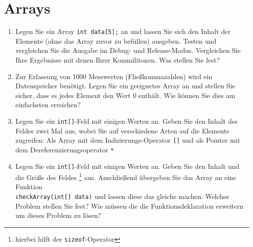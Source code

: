 \documentclass[paper=a4, fontsize=11pt, twoside]{scrartcl}
\begin{document}
\section*{Arrays}
\begin{enumerate}[resume]
  \item Legen Sie ein Array \texttt{int data[5];} an und lassen Sie sich den Inhalt der Elemente (ohne das Array zuvor zu befüllen) ausgeben. Testen und vergleichen Sie die Ausgabe im Debug- und Release-Modus. Vergleichen Sie Ihre Ergebnisse mit denen Ihrer Kommilitonen. Was stellen Sie fest?
  \item Zur Erfassung von 1000 Messwerten (Fließkommazahlen) wird ein Datenspeicher benötigt. Legen Sie ein geeignetes Array an und stellen Sie sicher, dass es jedes Element den Wert 0 enthält. Wie können Sie dies am einfachsten erreichen?
  \item Legen Sie ein \texttt{int[]}-Feld mit einigen Werten an. Geben Sie den Inhalt des Feldes zwei Mal aus, wobei Sie auf verschiedene Arten auf die Elemente zugreifen: Als Array mit dem Indizierungs-Operator \texttt{[]} und als Pointer mit dem Dereferenzierungsoperator \texttt{*}
  \item Legen Sie ein \texttt{int[]}-Feld mit einigen Werten an. Geben Sie den Inhalt und die Größe des Feldes \footnote{hierbei hilft der \texttt{sizeof}-Operator} aus. Anschließend übergeben Sie das Array an eine Funktion \\\texttt{checkArray(int[] data)} und lassen diese das gleiche machen. Welches Problem stellen Sie fest? Wie müssen die die Funktionsdeklaration erweitern um dieses Problem zu lösen?
\end{enumerate}
\end{document}
